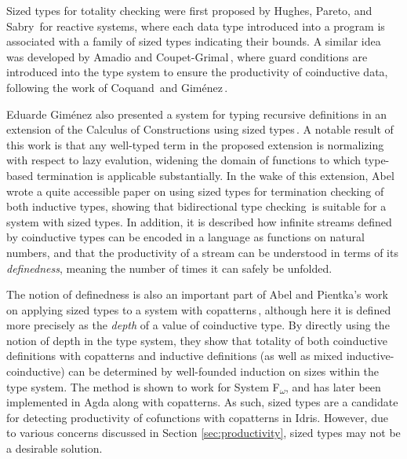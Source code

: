 Sized types for totality checking were first proposed by Hughes, Pareto, and Sabry\,\citep{Hughes96} for reactive systems, where each data type introduced into a program is associated with a family of sized types indicating their bounds. A similar idea was developed by Amadio and Coupet-Grimal\,\citep{Amadio98}, where guard conditions are introduced into the type system to ensure the productivity of coinductive data, following the work of Coquand\,\citep{Coquand94} and Gim\'{e}nez\,\citep{Gimenez95}.

Eduarde Gim\'{e}nez also presented a system for typing recursive definitions in an extension of the Calculus of Constructions using sized types\,\citep{Gimenez98structuralrecursive}. A notable result of this work is that any well-typed term in the proposed extension is normalizing with respect to lazy evalution, widening the domain of functions to which type-based termination is applicable substantially. In the wake of this extension, Abel\,\citep{Abel99terminationchecking} wrote a quite accessible paper on using sized types for termination checking of both inductive types, showing that bidirectional type checking\,\citep{Pierce00} is suitable for a system with sized types. In addition, it is described how infinite streams defined by coinductive types can be encoded in a language as functions on natural numbers, and that the productivity of a stream can be understood in terms of its \emph{definedness}, meaning the number of times it can safely be unfolded.

The notion of definedness is also an important part of Abel and Pientka's work on applying sized types to a system with copatterns\,\citep{Abel13Wellfounded}, although here it is defined more precisely as the \emph{depth} of a value of coinductive type. By directly using the notion of depth in the type system, they show that totality of both coinductive definitions with copatterns and inductive definitions (as well as mixed inductive-coinductive) can be determined by well-founded induction on sizes within the type system. The method is shown to work for System F\textsubscript{$\omega$}, and has later been implemented in Agda along with copatterns. As such, sized types are a candidate for detecting productivity of cofunctions with copatterns in Idris. However, due to various concerns discussed in Section \ref{sec:productivity}, sized types may not be a desirable solution.

